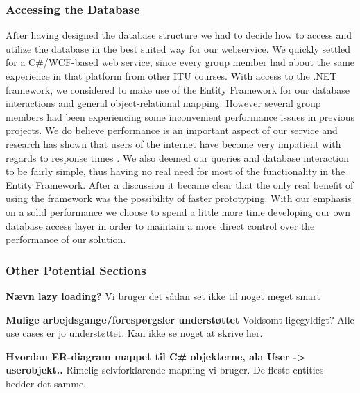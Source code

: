 \subsubsection{Accessing the Database}
\label{sec:databaseaccess}
After having designed the database structure we had to decide how to access and utilize the database in the best suited way for our webservice. We quickly settled for a C\#/WCF-based web service, since every group member had about the same experience in that platform from other ITU courses.
With access to the .NET framework, we considered to make use of the Entity Framework for our database interactions and general object-relational mapping. However several group members had been experiencing some inconvenient performance issues in previous projects. We do believe performance is an important aspect of our service and research has shown that users of the internet have become very impatient with regards to response times \cite{webusersflee}. We also deemed our queries and database interaction to be fairly simple, thus having no real need for most of the functionality in the Entity Framework. After a discussion it became clear that the only real benefit of using the framework was the possibility of faster prototyping. With our emphasis on a solid performance we choose to spend a little more time developing our own database access layer in order to maintain a more direct control over the performance of our solution.

\subsubsection{Other Potential Sections}
\textbf{Nævn lazy loading?}
Vi bruger det sådan set ikke til noget meget smart

\textbf{Mulige arbejdsgange/forespørgsler understøttet}
Voldsomt ligegyldigt? Alle use cases er jo understøttet. Kan ikke se noget at skrive her.

\textbf{Hvordan ER-diagram mappet til C\# objekterne, ala User -> userobjekt..}
Rimelig selvforklarende mapning vi bruger. De fleste entities hedder det samme.
